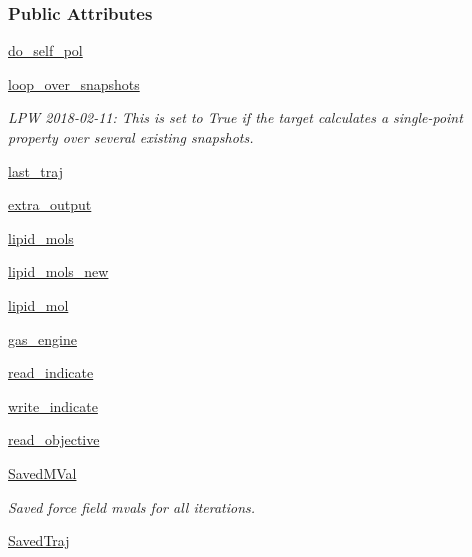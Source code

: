 \subsubsection*{Public Attributes}
\begin{DoxyCompactItemize}
\item 
\hyperlink{classsrc_1_1lipid_1_1Lipid_aeaca091353262fa28170883792b04460}{do\+\_\+self\+\_\+pol}
\item 
\hyperlink{classsrc_1_1lipid_1_1Lipid_a8c379d95998c085bc82a8764de7008b3}{loop\+\_\+over\+\_\+snapshots}
\begin{DoxyCompactList}\small\item\em L\+PW 2018-\/02-\/11\+: This is set to True if the target calculates a single-\/point property over several existing snapshots. \end{DoxyCompactList}\item 
\hyperlink{classsrc_1_1lipid_1_1Lipid_ab753d9fe970adb234eac32bdf4c09c38}{last\+\_\+traj}
\item 
\hyperlink{classsrc_1_1lipid_1_1Lipid_aa2d38f30dafffb10d902b553b59e4ac2}{extra\+\_\+output}
\item 
\hyperlink{classsrc_1_1lipid_1_1Lipid_a6d4de24b752f8ac3e11d9ac8e6332b9a}{lipid\+\_\+mols}
\item 
\hyperlink{classsrc_1_1lipid_1_1Lipid_a344f6388ad76552816eac50602433e70}{lipid\+\_\+mols\+\_\+new}
\item 
\hyperlink{classsrc_1_1lipid_1_1Lipid_a3336141dd3d85ad4889052d99b8f9497}{lipid\+\_\+mol}
\item 
\hyperlink{classsrc_1_1lipid_1_1Lipid_a1db61e137707f5926a5276bc76a76e93}{gas\+\_\+engine}
\item 
\hyperlink{classsrc_1_1lipid_1_1Lipid_a626604645e52807b937034703b9e0aed}{read\+\_\+indicate}
\item 
\hyperlink{classsrc_1_1lipid_1_1Lipid_acbb3ad5561e4ae774e191e4970607272}{write\+\_\+indicate}
\item 
\hyperlink{classsrc_1_1lipid_1_1Lipid_ae9dcd7e5f17cf200cfd1ca2c75e35402}{read\+\_\+objective}
\item 
\hyperlink{classsrc_1_1lipid_1_1Lipid_aba2be5f781c35d1d91895b824e229908}{Saved\+M\+Val}
\begin{DoxyCompactList}\small\item\em Saved force field mvals for all iterations. \end{DoxyCompactList}\item 
\hyperlink{classsrc_1_1lipid_1_1Lipid_aaff6ba231857cb620916cfc6e2bd2609}{Saved\+Traj}

\end{DoxyCompactItemize}
